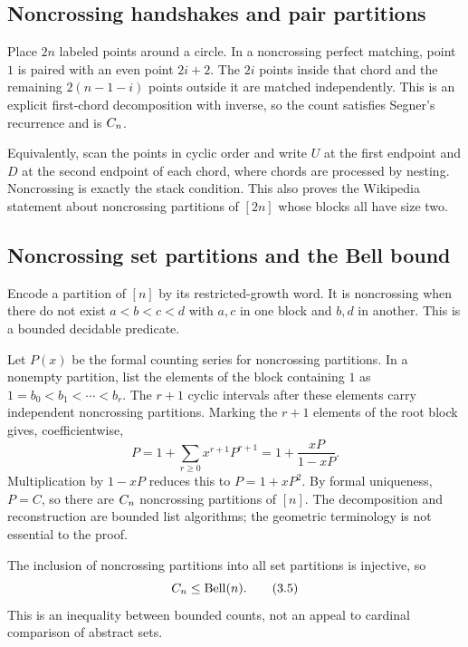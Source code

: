 \subsection{Noncrossing handshakes and pair partitions}

Place $2n$ labeled points around a circle.  In a noncrossing perfect matching,
point $1$ is paired with an even point $2i+2$.  The $2i$ points inside that
chord and the remaining $2(n-1-i)$ points outside it are matched
independently.  This is an explicit first-chord decomposition with inverse,
so the count satisfies Segner's recurrence and is $C_n$.

Equivalently, scan the points in cyclic order and write $U$ at the first
endpoint and $D$ at the second endpoint of each chord, where chords are
processed by nesting.  Noncrossing is exactly the stack condition.  This also
proves the Wikipedia statement about noncrossing partitions of $[2n]$ whose
blocks all have size two.

\subsection{Noncrossing set partitions and the Bell bound}

Encode a partition of $[n]$ by its restricted-growth word.  It is noncrossing
when there do not exist $a<b<c<d$ with $a,c$ in one block and $b,d$ in another.
This is a bounded decidable predicate.

Let $P(x)$ be the formal counting series for noncrossing partitions.  In a
nonempty partition, list the elements of the block containing $1$ as
$1=b_0<b_1<\cdots<b_r$.  The $r+1$ cyclic intervals after these elements carry
independent noncrossing partitions.  Marking the $r+1$ elements of the root
block gives, coefficientwise,
\[
 P=1+\sum_{r\ge0}x^{r+1}P^{r+1}
  =1+\frac{xP}{1-xP}.                                           \tag{3.4}\label{eq:NCseries}
\]
Multiplication by $1-xP$ reduces this to $P=1+xP^2$.  By formal uniqueness,
$P=C$, so there are $C_n$ noncrossing partitions of $[n]$.  The decomposition
and reconstruction are bounded list algorithms; the geometric terminology is
not essential to the proof.

The inclusion of noncrossing partitions into all set partitions is injective,
so
\[
 C_n\le \operatorname{Bell}(n).                               \tag{3.5}\label{eq:bell-bound}
\]
This is an \ipra{} inequality between bounded counts, not an appeal to cardinal
comparison of abstract sets.

